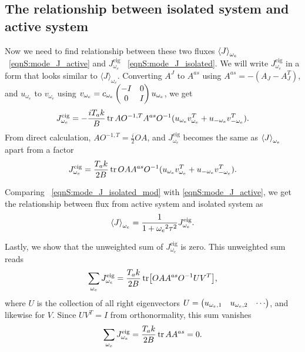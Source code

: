 \documentclass[
 amsmath,amssymb,
 aps,
 pre,
 longbibliography,
 10pt, onecolumn,
 notitlepage
]{revtex4-1}
\begin{document}
\subsection{The relationship between isolated system and active system}
Now we need to find relationship between these two fluxes $\expval{J}_{\omega_e}$ \eqnname~\eqref{eqnS:mode_J_active} and $J_{\omega_e}^\text{eig}$ \eqnname~\eqref{eqnS:mode_J_isolated}.
We will write $J_{\omega_e}^\text{eig}$ in a form that looks similar to
$\langle J\rangle_{\omega_e}$.
Converting $A^{J}$ to $A^{as}$ using $A^{as}=-(A_J-A_J^T)$, and $u_{\omega_e}$ to $v_{\omega_e}$ using $v_{\omega_e} = c_{\omega_e} \pmqty{ -I & 0 \\ 0 & I } u_{\omega_e}$, we get
\begin{equation}
J_{\omega_e}^\text{eig} = -\frac{iT_ak}{B} \tr AO^{-1,T}A^{as}O^{-1} (u_{\omega_e} v_{\omega_e}^T + u_{-{\omega_e}}v_{-{\omega_e}}^T) .
\end{equation}
From direct calculation, $AO^{-1,T} = \frac{i}{2} OA$, and $J_{\omega_e}^\text{eig}$ becomes the same as $\expval{J}_{\omega_e}$ apart from a factor
\begin{equation} \label{eqnS:mode_J_isolated_mod}
J_{\omega_e}^\text{eig} = \frac{T_ak}{2B} \tr OAA^{as}O^{-1} (u_{\omega_e} v_{\omega_e}^T + u_{-{\omega_e}}v_{-{\omega_e}}^T) .
\end{equation}

Comparing \eqnname~\eqref{eqnS:mode_J_isolated_mod} with \eqref{eqnS:mode_J_active}, we get the relationship between flux from active system and isolated system as
\begin{equation} \label{eqnS:mode_J_relation}
\expval{J}_{\omega_e} = \frac{1}{1 + {\omega_e}^2 \tau^2} J_{\omega_e}^\text{eig} .
\end{equation}

Lastly, we show that the unweighted sum of $J_{\omega_e}^\text{eig}$ is zero.
This unweighted sum reads
\begin{equation}
\sum_{\omega_e} J_{\omega_e}^\text{eig} = \frac{T_ak}{2B} \tr [O A A^{as} O^{-1} UV^T],
\end{equation}
where $U$ is the collection of all right eigenvectors $U = \pmqty{u_{\omega_e,1} & u_{\omega_e,2} & \cdots}$, and likewise for $V$.
Since $UV^T = I$ from orthonormality, this sum vanishes
\begin{equation} \label{eqnS:mode_J_sum}
\sum_{\omega_e} J_{\omega_e}^\text{eig} = \frac{T_ak}{2B} \tr A A^{as} = 0.
\end{equation}
\end{document}
